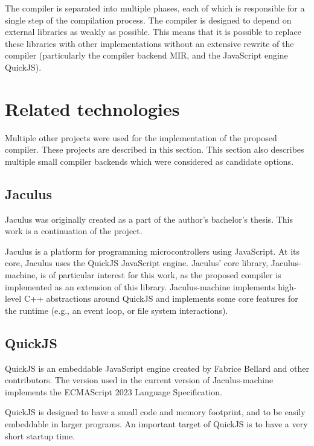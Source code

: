 The compiler is separated into multiple phases, each of which is responsible for a single step of the compilation process. The compiler is designed to depend on external libraries as weakly as possible. This means that it is possible to replace these libraries with other implementations without an extensive rewrite of the compiler (particularly the compiler backend MIR, and the JavaScript engine QuickJS).



\section{Related technologies}

Multiple other projects were used for the implementation of the proposed compiler. These projects are described in this section. This section also describes multiple small compiler backends which were considered as candidate options.

\subsection{Jaculus}\label{jaculus}

Jaculus was originally created as a part of the author's bachelor's thesis\cite{jaculusthesis}. This work is a continuation of the project.

Jaculus is a platform for programming microcontrollers using JavaScript. At its core, Jaculus uses the QuickJS JavaScript engine. Jaculus' core library, Jaculus-machine, is of particular interest for this work, as the proposed compiler is implemented as an extension of this library. Jaculus-machine implements high-level C++ abstractions around QuickJS and implements some core features for the runtime (e.g., an event loop, or file system interactions).


\subsection{QuickJS}

QuickJS is an embeddable JavaScript engine created by Fabrice Bellard and other contributors\cite{quickjs}. The version used in the current version of Jaculus-machine implements the ECMAScript 2023 Language Specification\cite{ecma262}.

QuickJS is designed to have a small code and memory footprint, and to be easily embeddable in larger programs. An important target of QuickJS is to have a very short startup time.

